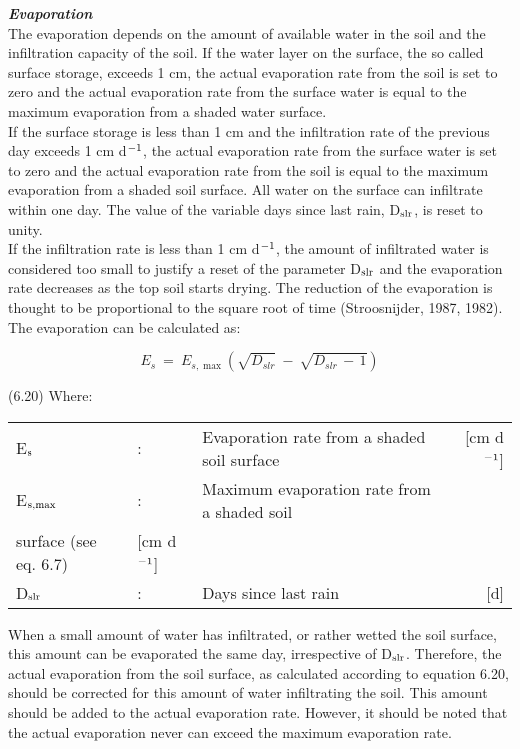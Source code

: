 {\it {\bf Evaporation}\/}\\
The evaporation depends on the amount of available water in the soil and the infiltration
capacity of the soil. If the water layer on the surface, the so called surface storage, 
exceeds 1 cm, the actual {\nobreak}evaporation rate from the soil is set to zero and the actual
evaporation rate from the surface water is equal to the maximum evaporation from a
shaded water surface.\\
If the surface storage is less than 1 cm and the infiltration rate of the previous day
exceeds 1 cm d$^{{\rm -1}}$, the actual evaporation rate from the surface water is set to zero and the
actual evaporation rate from the soil is equal to the maximum evaporation from a shaded
soil surface. All water on the surface can infiltrate within one day. The value of the
variable days since last rain, D$_{{\rm slr}}$, is reset to unity.\\
If the infiltration rate is less than 1 cm d$^{{\rm -1}}$, the amount of infiltrated water is consid\-ered
too small to justify a reset of the parameter D$_{{\rm slr}}$ and the evaporation rate decreases as the
top soil starts drying. The reduction of the evaporation is thought to be proportional to the
square root of time (Stroosnijder, 1987, 1982). The evaporation can be calculated as:

\begin{equation}
E _{s} ~=~ E _{s,\max } ( \sqrt{D _{slr} } ~-~ \sqrt{D _{slr} \, -\, 1} )
\end{equation}

 
\strut\hfill (6.20)
Where:\\
\begin{tabularx}{\textwidth}{llXr}
E$_{{\rm s}}$ &:& Evaporation rate from a shaded soil surface  & [cm d$^{{\rm -1}}$]\\
E$_{{\rm s,max}}$ &:& Maximum evaporation rate from a shaded soil\\
   surface (see eq. 6.7)  & [cm d$^{{\rm -1}}$]\\
D$_{{\rm slr}}$ &:& Days since last rain  & [d]
\end{tabularx}



When a small amount of water has infiltrated, or rather wetted the soil surface, this
amount can be evaporated the same day, irrespective of D$_{{\rm slr}}$. Therefore, the actual
evaporation from the soil surface, as calculated according to equation 6.20, should be
corrected for this amount of water infiltrating the soil. This amount should be added to
the actual evaporation rate. However, it should be noted that the actual evaporation never
can exceed the maximum evaporation rate.



